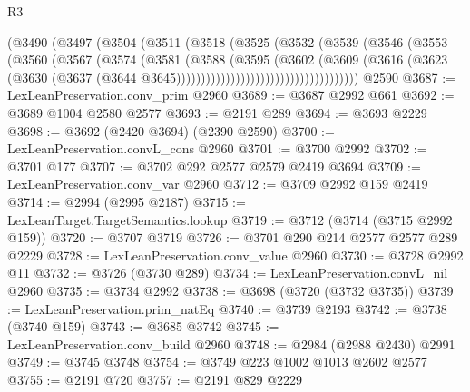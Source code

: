 \begin{lexlean}{R3}
\begin{coremodule}
                                (@3490
                                  (@3497
                                    (@3504
                                      (@3511
                                        (@3518
                                          (@3525
                                            (@3532
                                              (@3539
                                                (@3546
                                                  (@3553
                                                    (@3560
                                                      (@3567
                                                        (@3574
                                                          (@3581
                                                            (@3588
                                                              (@3595
                                                                (@3602
                                                                  (@3609
                                                                    (@3616
                                                                      (@3623
                                                                        (@3630
                                                                          (@3637
                                                                            (@3644
                                                                              @3645)))))))))))))))))))))))))))))))))))))
    @2590
@3687 := LexLeanPreservation.conv_prim @2960
@3689 := @3687 @2992 @661
@3692 := @3689 @1004 @2580 @2577
@3693 := @2191 @289
@3694 := @3693 @2229
@3698 := @3692 (@2420 @3694) (@2390 @2590)
@3700 := LexLeanPreservation.convL_cons @2960
@3701 := @3700 @2992
@3702 := @3701 @177
@3707 := @3702 @292 @2577 @2579 @2419 @3694
@3709 := LexLeanPreservation.conv_var @2960
@3712 := @3709 @2992 @159 @2419
@3714 := @2994 (@2995 @2187)
@3715 := LexLeanTarget.TargetSemantics.lookup
@3719 := @3712 (@3714 (@3715 @2992 @159))
@3720 := @3707 @3719
@3726 := @3701 @290 @214 @2577 @2577 @289 @2229
@3728 := LexLeanPreservation.conv_value @2960
@3730 := @3728 @2992 @11
@3732 := @3726 (@3730 @289)
@3734 := LexLeanPreservation.convL_nil @2960
@3735 := @3734 @2992
@3738 := @3698 (@3720 (@3732 @3735))
@3739 := LexLeanPreservation.prim_natEq
@3740 := @3739 @2193
@3742 := @3738 (@3740 @159)
@3743 := @3685 @3742
@3745 := LexLeanPreservation.conv_build @2960
@3748 := @2984 (@2988 @2430) @2991
@3749 := @3745 @3748
@3754 := @3749 @223 @1002 @1013 @2602 @2577
@3755 := @2191 @720
@3757 := @2191 @829 @2229

\end{coremodule}
\end{lexlean}

